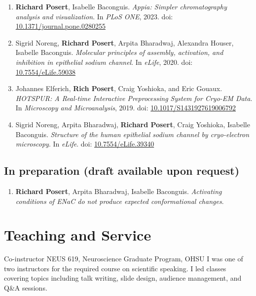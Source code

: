 \documentclass{prometheus_cv}
\begin{document}
\begin{enumerate}
	\item \textbf{Richard Posert}, Isabelle Baconguis. \textit{Appia: Simpler chromatography analysis and visualization}. In \textit{PLoS ONE}, 2023. doi: \href{https://doi.org/10.1371/journal.pone.0280255}{10.1371/journal.pone.0280255}
	\item Sigrid Noreng, \textbf{Richard Posert}, Arpita Bharadwaj, Alexandra Houser, Isabelle Baconguis. \textit{Molecular principles of assembly, activation, and inhibition in epithelial sodium channel}. In \textit{eLife}, 2020. doi: \href{https://doi.org/10.7554/eLife.59038}{10.7554/eLife.59038}
	\item Johannes Elferich, \textbf{Rich Posert}, Craig Yoshioka, and Eric Gouaux. \textit{HOTSPUR: A Real-time Interactive Preprocessing System for Cryo-EM Data}. In \textit{Microscopy and Microanalysis}, 2019. doi: \href{https://doi.org/10.1017/S1431927619006792}{10.1017/S1431927619006792}
	\item Sigrid Noreng, Arpita Bharadwaj, \textbf{Richard Posert}, Craig Yoshioka, Isabelle Baconguis. \textit{Structure of the human epithelial sodium channel by cryo-electron microscopy}. In \textit{eLife}. doi: \href{https://doi.org/10.7554/eLife.39340}{10.7554/eLife.39340}
	\setcounter{publicationCounter}{\value{enumi}}	%
\end{enumerate}

\subsection{In preparation (draft available upon request)}
\begin{enumerate}
	\setcounter{enumi}{\value{publicationCounter}}
	\item \textbf{Richard Posert}, Arpita Bharadwaj, Isabelle Baconguis. \textit{Activating conditions of ENaC do not produce expected conformational changes}.
\end{enumerate}

\section{Teaching and Service}
{Co-instructor}
{NEUS 619, Neuroscience Graduate Program, OHSU}
{%
	I was one of two instructors for the required course on scientific speaking.
	I led classes covering topics including talk writing, slide design, audience management, and Q\&A sessions.}
\end{document}
